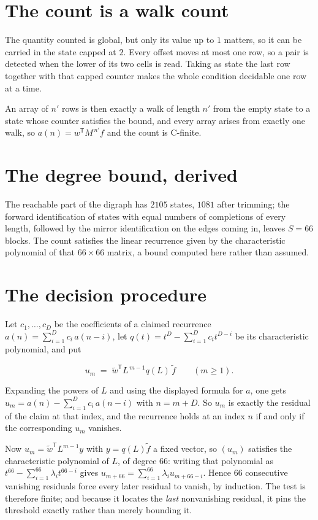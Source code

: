 \documentclass[11pt]{article}
\theoremstyle{definition}
\begin{document}
\section{The count is a walk count}

The quantity counted is global, but only its value up to $1$ matters, so it can be carried in the state capped at $2$. Every offset moves at most one row, so a pair is detected when the lower of its two cells is read. Taking as state the last row together with that capped counter makes the whole condition decidable one row at a time.

An array of $n'$ rows is then exactly a walk of length $n'$ from the empty state to a state whose counter satisfies the bound, and every array arises from exactly one walk, so $a(n) = w^{\mathsf T}M^{\,n'}f$ and the count is C-finite.

\section{The degree bound, derived}

The reachable part of the digraph has $2105$ states, $1081$ after trimming; the forward identification of states with equal numbers of completions of every length, followed by the mirror identification on the edges coming in, leaves $S = 66$ blocks. The count satisfies the linear recurrence given by the characteristic polynomial of that $66\times66$ matrix, a bound computed here rather than assumed.

\section{The decision procedure}

Let $c_1,\dots,c_D$ be the coefficients of a claimed recurrence $a(n) = \sum_{i=1}^{D} c_i\,a(n-i)$, let $q(t) = t^{D} - \sum_{i=1}^{D} c_i t^{D-i}$ be its characteristic polynomial, and put

\[u_m \;=\; \tilde w^{\mathsf T} L^{\,m-1} q(L)\,\tilde f \qquad (m \ge 1).\]

Expanding the powers of $L$ and using the displayed formula for $a$, one gets $u_m = a(n) - \sum_{i=1}^{D} c_i\,a(n-i)$ with $n = m + D$. So $u_m$ is exactly the residual of the claim at that index, and the recurrence holds at an index $n$ if and only if the corresponding $u_m$ vanishes.

Now $u_m = \tilde w^{\mathsf T} L^{m-1} y$ with $y = q(L)\tilde f$ a fixed vector, so $(u_m)$ satisfies the characteristic polynomial of $L$, of degree $66$: writing that polynomial as $t^{66} - \sum_{i=1}^{66} \lambda_i t^{66-i}$ gives $u_{m+66} = \sum_{i=1}^{66} \lambda_i u_{m+66-i}$. Hence $66$ consecutive vanishing residuals force every later residual to vanish, by induction. The test is therefore finite; and because it locates the {\itshape last} nonvanishing residual, it pins the threshold exactly rather than merely bounding it.
\end{document}
